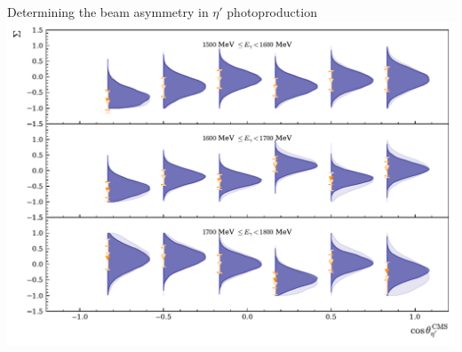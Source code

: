 \documentclass[11pt,aspectratio=169,dvipsnames]{beamer}
\begin{document}
	
	\begin{frame}{Determining the beam asymmetry in $\eta'$ photoproduction}
		\centering
		\includegraphics[width=.78\linewidth]{../../bayes/etap_event_based_fit/plots/sigma_etap_talk.pdf}
	\end{frame}
	
	
	
	
	
\end{document}
